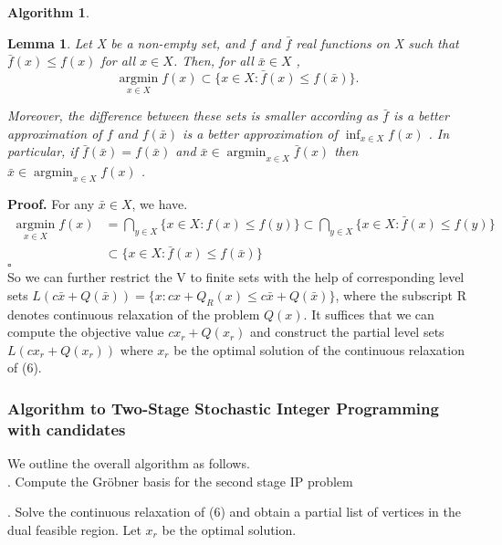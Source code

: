 \documentclass{article}
\theoremstyle{plain}
\newtheorem{lemma}[theorem]{Lemma}
\theoremstyle{definition}
\newtheorem{algorithm}[theorem]{Algorithm}
\begin{document}
\begin{algorithm}
\begin{lemma}Let  X  be a non-empty set, and  $f$  and  $\bar{f}$  real functions on  X  such that  $\bar{f}(x) \leqslant f(x)$  for all  $x \in X$. Then, for all  $\bar{x} \in X$ ,
$$ \underset{x \in X}{\operatorname{argmin}} f(x) \subset\{x \in X: \bar{f}(x) \leqslant f(\bar{x})\}.$$

Moreover, the difference between these sets is smaller according as  $\bar{f}$  is a better approximation of  $f $ and  $f(\bar{x})$  is a better approximation of  $\inf _{x \in X} f(x)$ . In particular, if  $\bar{f}(\bar{x})=f(\bar{x}) $ and  $\bar{x} \in \operatorname{argmin}_{x \in X} \bar{f}(x) $  then  $\bar{x} \in \operatorname{argmin}_{x \in X} f(x)$ .
\end{lemma}

\noindent \textbf{Proof.} For any  $\bar{x} \in X $, we have.
$$
\begin{aligned}
\underset{x \in X}{\operatorname{argmin}} f(x) &=\bigcap_{y \in X}\{x \in X: f(x) \leqslant f(y)\} \subset \bigcap_{y \in X}\{x \in X: \bar{f}(x) \leqslant f(y)\} \\
& \subset\{x \in X: \bar{f}(x) \leqslant f(\bar{x})\}
\end{aligned}
$$
\hfill $\square$\\

So we can further restrict the V to finite sets with the help of corresponding level sets $L(c\bar{x}+Q(\bar{x}))=\{x:cx+Q_R(x)\leq c\bar{x}+Q(\bar{x})\}$, where the subscript R denotes continuous relaxation of the problem $Q(x)$. It suffices that we can compute the objective value  $c x_{r}+Q\left(x_{r}\right) $ and construct the partial level sets  $L\left(c x_{r}+Q\left(x_{r}\right)\right) $ where $x_{r}$  be the optimal solution of the continuous relaxation of (6).

\subsubsection{Algorithm to Two-Stage Stochastic Integer Programming with candidates}

We outline the overall  algorithm as follows. \\

\noindent {}. Compute the Gröbner basis for the second stage IP problem 

\noindent {}. Solve the continuous relaxation of (6) and obtain a partial list of vertices in the dual feasible region. Let  $x_{r}$  be the optimal solution. 


\end{algorithm}
\end{document}
